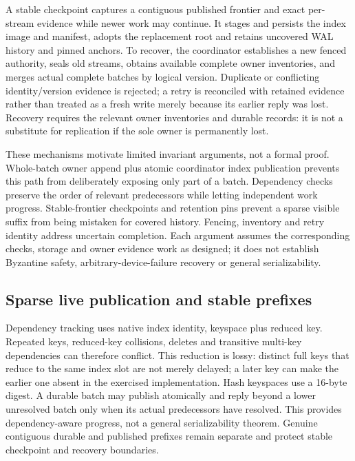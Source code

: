 \documentclass[11pt,a4paper]{article}
\begin{document}
A stable checkpoint captures a contiguous published frontier and exact per-stream evidence while newer work may continue. It stages and persists the index image and manifest, adopts the replacement root and retains uncovered WAL history and pinned anchors. To recover, the coordinator establishes a new fenced authority, seals old streams, obtains available complete owner inventories, and merges actual complete batches by logical version. Duplicate or conflicting identity/version evidence is rejected; a retry is reconciled with retained evidence rather than treated as a fresh write merely because its earlier reply was lost. Recovery requires the relevant owner inventories and durable records: it is not a substitute for replication if the sole owner is permanently lost.

These mechanisms motivate limited invariant arguments, not a formal proof. Whole-batch owner append plus atomic coordinator index publication prevents this path from deliberately exposing only part of a batch. Dependency checks preserve the order of relevant predecessors while letting independent work progress. Stable-frontier checkpoints and retention pins prevent a sparse visible suffix from being mistaken for covered history. Fencing, inventory and retry identity address uncertain completion. Each argument assumes the corresponding checks, storage and owner evidence work as designed; it does not establish Byzantine safety, arbitrary-device-failure recovery or general serializability.


\subsection{Sparse live publication and stable prefixes}\label{sec:publication}
Dependency tracking uses native index identity, keyspace plus reduced key. Repeated keys, reduced-key collisions, deletes and transitive multi-key dependencies can therefore conflict. This reduction is lossy: distinct full keys that reduce to the same index slot are not merely delayed; a later key can make the earlier one absent in the exercised implementation. Hash keyspaces use a 16-byte digest. A durable batch may publish atomically and reply beyond a lower unresolved batch only when its actual predecessors have resolved. This provides dependency-aware progress, not a general serializability theorem. Genuine contiguous durable and published prefixes remain separate and protect stable checkpoint and recovery boundaries.
\end{document}
